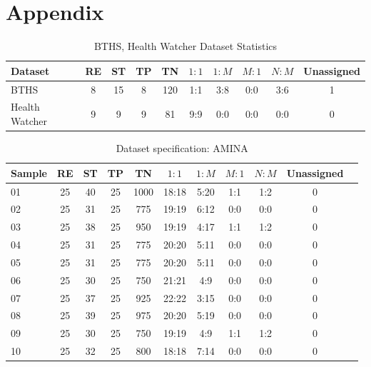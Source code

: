 \documentclass[conference]{IEEEtran}
\begin{document}




\onecolumn
\section*{Appendix}\label{appendix}

\begin{table}[h]
    \centering
    \caption{BTHS, Health Watcher Dataset Statistics}
    \begin{tabular}{@{}l|ccccccccc@{}}
    \toprule
    Dataset & RE & ST & TP & TN & $1{:}1$ & $1{:}M$ & $M{:}1$ & $N{:}M$ & Unassigned\\
    \midrule
    BTHS           & 8 & 15 & 8 & 120 & 1:1 & 3:8 & 0:0 & 3:6 & 1\\
    Health Watcher & 9 & 9  & 9 & 81  & 9:9 & 0:0 & 0:0 & 0:0 & 0\\
    \bottomrule
    \end{tabular}
    \label{tab:bths-hw}
\end{table}

\begin{table}[h]
    \centering
    \caption{Dataset specification: AMINA}
    \begin{tabular}{@{}l|cccccccccc@{}}
    \toprule
    Sample & RE & ST & TP & TN & $1{:}1$ & $1{:}M$ & $M{:}1$ & $N{:}M$ & Unassigned\\
    \midrule
    01 & 25 & 40 & 25 & 1000 & 18:18 & 5:20 & 1:1 & 1:2 & 0 \\
    02 & 25 & 31 & 25 & 775  & 19:19 & 6:12 & 0:0 & 0:0 & 0 \\
    03 & 25 & 38 & 25 & 950  & 19:19 & 4:17 & 1:1 & 1:2 & 0 \\
    04 & 25 & 31 & 25 & 775  & 20:20 & 5:11 & 0:0 & 0:0 & 0 \\
    05 & 25 & 31 & 25 & 775  & 20:20 & 5:11 & 0:0 & 0:0 & 0 \\
    06 & 25 & 30 & 25 & 750  & 21:21 & 4:9 & 0:0 & 0:0 & 0 \\
    07 & 25 & 37 & 25 & 925  & 22:22 & 3:15 & 0:0 & 0:0 & 0 \\
    08 & 25 & 39 & 25 & 975  & 20:20 & 5:19 & 0:0 & 0:0 & 0 \\
    09 & 25 & 30 & 25 & 750  & 19:19 & 4:9 & 1:1 & 1:2 & 0 \\
    10 & 25 & 32 & 25 & 800  & 18:18 & 7:14 & 0:0 & 0:0 & 0 \\
    \bottomrule
    \end{tabular}
    \label{tab:amina}
\end{table}
\end{document}
